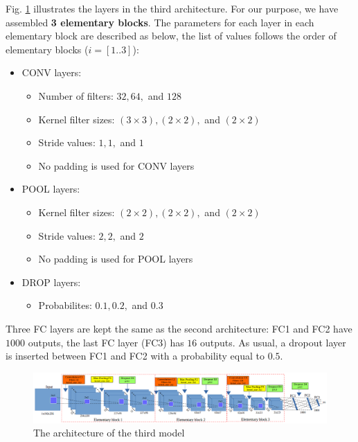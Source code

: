 \documentclass[review]{elsarticle}
\begin{document}
Fig. \ref{fignet3} illustrates the layers in the third architecture. For our purpose, we have assembled \textbf{3 elementary blocks}. The parameters for each layer in each elementary block are described as below, the list of values follows the order of elementary blocks ($i = [1..3]$):
\begin{itemize}
	\item CONV layers:
	\begin{itemize}
		\item Number of filters: $32, 64, $ and $128$
		\item Kernel filter sizes: $(3 \times 3), (2 \times 2), $ and $(2 \times 2)$
		\item Stride values: $1, 1, $ and $1$
		\item No padding is used for CONV layers 
	\end{itemize}
	\item POOL layers:
		\begin{itemize}
			\item Kernel filter sizes: $(2 \times 2), (2 \times 2), $ and $(2 \times 2)$
			\item Stride values: $2, 2, $ and $2$
			\item No padding is used for POOL layers
		\end{itemize}
	\item DROP layers:
		\begin{itemize}
			\item Probabilites: $0.1, 0.2, $ and $0.3$
		\end{itemize}
\end{itemize}

Three FC layers are kept the same as the second architecture: FC1 and FC2 have $1000$ outputs, the last FC layer (FC3) has $16$ outputs. As usual, a dropout layer is inserted between FC1 and FC2 with a probability equal to $0.5$.
\begin{figure}[h]
	\centering
	\includegraphics[scale=0.3]{images/net3}
	\caption{The architecture of the third model}
	\label{fignet3}
\end{figure}
\end{document}

